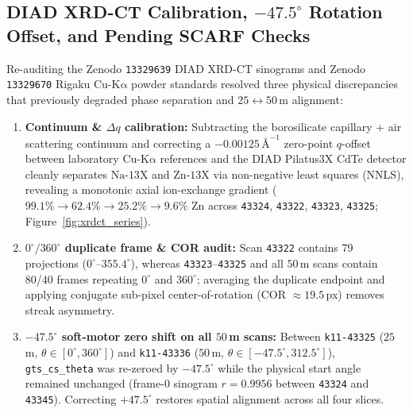 \documentclass[10pt]{article}
\begin{document}
\subsection{DIAD XRD-CT Calibration, \texorpdfstring{$-47.5^\circ$}{-47.5 deg} Rotation Offset, and Pending SCARF Checks}
Re-auditing the Zenodo \texttt{13329639} DIAD XRD-CT sinograms and Zenodo \texttt{13329670} Rigaku Cu-$\mathrm{K\alpha}$ powder standards resolved three physical discrepancies that previously degraded phase separation and $25 \leftrightarrow 50$\,\textmu m alignment:
\begin{enumerate}
  \item \textbf{Continuum \& $\Delta q$ calibration:} Subtracting the borosilicate capillary + air scattering continuum and correcting a $-0.00125\,\text{\AA}^{-1}$ zero-point $q$-offset between laboratory Cu-$\mathrm{K\alpha}$ references and the DIAD Pilatus3X CdTe detector cleanly separates $\mathrm{Na\text{-}13X}$ and $\mathrm{Zn\text{-}13X}$ via non-negative least squares (NNLS), revealing a monotonic axial ion-exchange gradient ($99.1\% \to 62.4\% \to 25.2\% \to 9.6\%$ Zn across \texttt{43324}, \texttt{43322}, \texttt{43323}, \texttt{43325}; Figure~\ref{fig:xrdct_series}).
  \item \textbf{$0^\circ/360^\circ$ duplicate frame \& COR audit:} Scan \texttt{43322} contains 79 projections ($0^\circ$--$355.4^\circ$), whereas \texttt{43323}--\texttt{43325} and all $50$\,\textmu m scans contain 80/40 frames repeating $0^\circ$ and $360^\circ$; averaging the duplicate endpoint and applying conjugate sub-pixel center-of-rotation (COR $\approx 19.5$\,px) removes streak asymmetry.
  \item \textbf{$-47.5^\circ$ soft-motor zero shift on all $50$\,\textmu m scans:} Between \texttt{k11-43325} ($25$\,\textmu m, $\theta \in [0^\circ, 360^\circ]$) and \texttt{k11-43336} ($50$\,\textmu m, $\theta \in [-47.5^\circ, 312.5^\circ]$), \texttt{gts\_cs\_theta} was re-zeroed by $-47.5^\circ$ while the physical start angle remained unchanged (frame-0 sinogram $r = 0.9956$ between \texttt{43324} and \texttt{43345}). Correcting $+47.5^\circ$ restores spatial alignment across all four slices.
\end{enumerate}
\end{document}
